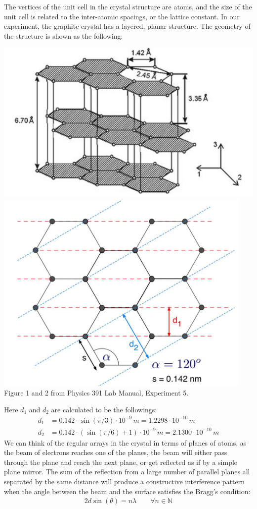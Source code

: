 \documentclass[11pt]{book}
\theoremstyle{break}
\theoremstyle{break}
\newcommand{\N}{\mathbb{N}}
\begin{document}
The vertices of the unit cell in the crystal structure are atoms, and the size of the unit cell is related to the inter-atomic spacings, or the lattice constant. In our experiment, the graphite crystal has a layered, planar structure. The geometry of the structure is shown as the following:
\begin{center}
\includegraphics[scale=0.69]{structure1.png}
\includegraphics[scale=0.69]{structure2.png}\\
\color{gray} Figure 1 and 2 from Physics 391 Lab Manual, Experiment 5.\color{black}
\end{center}
Here $d_1$ and $d_2$ are calculated to be the followings:
\begin{align*}
d_1 &= 0.142\cdot \sin(\pi/3)\cdot 10^{-9} \, m = 1.2298\cdot 10^{-10} \, m\\
d_2 &= 0.142\cdot (\sin(\pi/6)+1)\cdot 10^{-9} \, m = 2.1300\cdot 10^{-10}\, m
\end{align*}
We can think of the regular arrays in the crystal in terms of planes of atoms, as the beam of electrons reaches one of the planes, the beam will either pass through the plane and reach the next plane, or get reflected as if by a simple plane mirror. The sum of the reflection from a large number of parallel planes all separated by the same distance will produce a constructive interference pattern when the angle between the beam and the surface satisfies the Bragg's condition:
\begin{align*}
2d\sin(\theta) = n\lambda \qquad \forall n \in \N
\end{align*}
\end{document}
